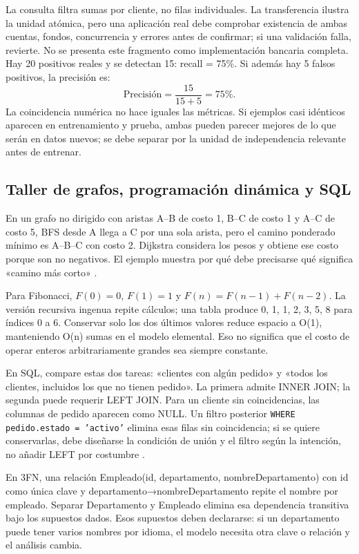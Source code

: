 La consulta filtra sumas por cliente, no filas individuales. La transferencia ilustra la unidad atómica, pero una aplicación real debe comprobar existencia de ambas cuentas, fondos, concurrencia y errores antes de confirmar; si una validación falla, revierte. No se presenta este fragmento como implementación bancaria completa.
Hay 20 positivos reales y se detectan 15: recall = 75\%. Si además hay 5 falsos positivos, la precisión es:
\[\mathrm{Precisión}=\frac{15}{15+5}=75\%.\] La coincidencia numérica no hace iguales las métricas. Si ejemplos casi idénticos aparecen en entrenamiento y prueba, ambas pueden parecer mejores de lo que serán en datos nuevos; se debe separar por la unidad de independencia relevante antes de entrenar.

\subsection{Taller de grafos, programación dinámica y SQL}
En un grafo no dirigido con aristas A--B de costo 1, B--C de costo 1 y A--C de costo 5, BFS desde A llega a C por una sola arista, pero el camino ponderado mínimo es A--B--C con costo 2. Dijkstra considera los pesos y obtiene ese costo porque son no negativos. El ejemplo muestra por qué debe precisarse qué significa «camino más corto» \cite{algorithms}.

Para Fibonacci, $F(0)=0$, $F(1)=1$ y $F(n)=F(n-1)+F(n-2)$. La versión recursiva ingenua repite cálculos; una tabla produce 0, 1, 1, 2, 3, 5, 8 para índices 0 a 6. Conservar solo los dos últimos valores reduce espacio a O(1), manteniendo O(n) sumas en el modelo elemental. Eso no significa que el costo de operar enteros arbitrariamente grandes sea siempre constante.

En SQL, compare estas dos tareas: «clientes con algún pedido» y «todos los clientes, incluidos los que no tienen pedido». La primera admite INNER JOIN; la segunda puede requerir LEFT JOIN. Para un cliente sin coincidencias, las columnas de pedido aparecen como NULL. Un filtro posterior \texttt{WHERE pedido.estado = 'activo'} elimina esas filas sin coincidencia; si se quiere conservarlas, debe diseñarse la condición de unión y el filtro según la intención, no añadir LEFT por costumbre \cite{postgres}.

En 3FN, una relación Empleado(id, departamento, nombreDepartamento) con id como única clave y departamento→nombreDepartamento repite el nombre por empleado. Separar Departamento y Empleado elimina esa dependencia transitiva bajo los supuestos dados. Esos supuestos deben declararse: si un departamento puede tener varios nombres por idioma, el modelo necesita otra clave o relación y el análisis cambia.

